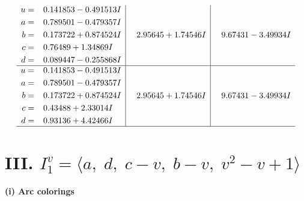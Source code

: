 \documentclass[1p]{elsarticle_modified}
\theoremstyle{definition}
\begin{document}
$$\begin{array}{c|c|c}
\begin{aligned}
u &= \phantom{-}0.141853 - 0.491513 I \\
a &= \phantom{-}0.789501 - 0.479357 I \\
b &= \phantom{-}0.173722 + 0.874524 I \\
c &= \phantom{-}0.76489 + 1.34869 I \\
d &= \phantom{-}0.089447 - 0.255868 I\end{aligned}
 & \phantom{-}2.95645 + 1.74546 I & \phantom{-}9.67431 - 3.49934 I \\ \hline\begin{aligned}
u &= \phantom{-}0.141853 - 0.491513 I \\
a &= \phantom{-}0.789501 - 0.479357 I \\
b &= \phantom{-}0.173722 + 0.874524 I \\
c &= \phantom{-}0.43488 + 2.33014 I \\
d &= \phantom{-}0.93136 + 4.42466 I\end{aligned}
 & \phantom{-}2.95645 + 1.74546 I & \phantom{-}9.67431 - 3.49934 I\\
 \hline 
 \end{array}$$\newpage\newpage\renewcommand{\arraystretch}{1}
\centering \section*{III. $I^v_{1}= \langle a,\;d,\;c- v,\;b- v,\;v^2- v+1 \rangle$}
\flushleft \textbf{(i) Arc colorings}\\
\end{document}
